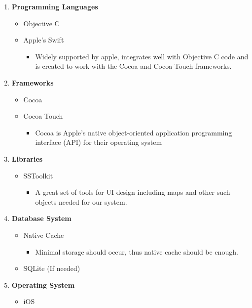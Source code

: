 \documentclass{article}
\begin{document}
			\begin{enumerate}
			 \item \textbf{Programming Languages}
				\begin{itemize}
					\item Objective C
					\item Apple's Swift
					\begin{itemize}
						\item Widely supported by apple, integrates well with Objective C code and is created to work with the Cocoa and Cocoa Touch frameworks.
					\end{itemize}
				\end{itemize}
			\item \textbf{Frameworks}
				\begin{itemize}
					\item Cocoa
					\item Cocoa Touch
					\begin{itemize}
						\item Cocoa is Apple's native object-oriented application programming interface (API) for their operating system
					\end{itemize}
				\end{itemize}
			\item \textbf{Libraries}
				\begin{itemize}
					\item SSToolkit
					\begin{itemize}
						\item A great set of tools for UI design including maps and other such objects needed for our system.
					\end{itemize}
				\end{itemize}
			\item \textbf{Database System}
				\begin{itemize}
					\item Native Cache
					\begin{itemize}
						\item Minimal storage should occur, thus native cache should be enough.
					\end{itemize}
	 				\item SQLite (If needed)
				\end{itemize}
			\item \textbf{Operating System}
				\begin{itemize}
	 				\item iOS
				\end{itemize}

\end{enumerate}
\end{document}
